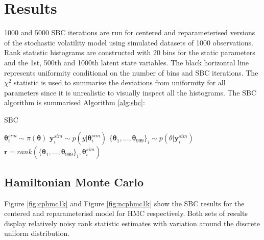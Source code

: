 \documentclass[12pt, a4paper]{article}
\begin{document}



\section{Results}
    1000 and 5000 SBC iterations are run for centered and reparameterised versions of the stochastic volatility model using simulated datasets of 1000 observations. Rank statistic histograms are constructed with 20 bins for the static parameters and the 1st, 500th and 1000th latent state variables. The black horizontal line represents uniformity conditional on the number of bins and SBC iterations. The $\chi^2$ statistic is used to summarise the deviations from uniformity for all parameters since it is unrealistic to visually inspect all the histograms. The SBC algorithm is summarised Algorithm \ref{alg:sbc}:

    \begin{algorithm}
        \caption{SBC}\label{alg:sbc}
        \begin{algorithmic}
                \State {} $\boldsymbol{\theta}^{sim}_i \sim\pi (\boldsymbol{\theta})$
                \State {} $\boldsymbol{y}^{sim}_i \sim p(y|\boldsymbol{\theta}^{sim}_i)$
                \State {} $\{\boldsymbol{\theta}_1,\dots , \boldsymbol{\theta}_{999}\}_i \sim p(\theta | \boldsymbol{y}^{sim}_i)$
                \State {} $\boldsymbol{r} = rank(\{\boldsymbol{\theta}_1,\dots , \boldsymbol{\theta}_{999}\}_i, \boldsymbol{\theta}^{sim}_i)$
              \EndFor
        \end{algorithmic}
        \end{algorithm}
        
    \subsection{Hamiltonian Monte Carlo}
    Figure \ref{fig:cphmc1k} and Figure \ref{fig:ncphmc1k} show the SBC results for the centered and reparameterisd model for HMC respectively. Both sets of results display relatively noisy rank statistic estimates with variation around the discrete uniform distribution.
\end{document}
